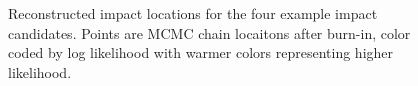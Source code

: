 \documentclass[a4paper]{jpconf}
\begin{document}
\begin{figure}[h!]
	\centering
	\quad
	\\	
        \quad
	\\	
	\caption{Reconstructed impact locations for the four example impact candidates. Points are MCMC chain locaitons after burn-in, color coded by log likelihood with warmer colors representing higher likelihood.}
\end{figure}
\end{document}
